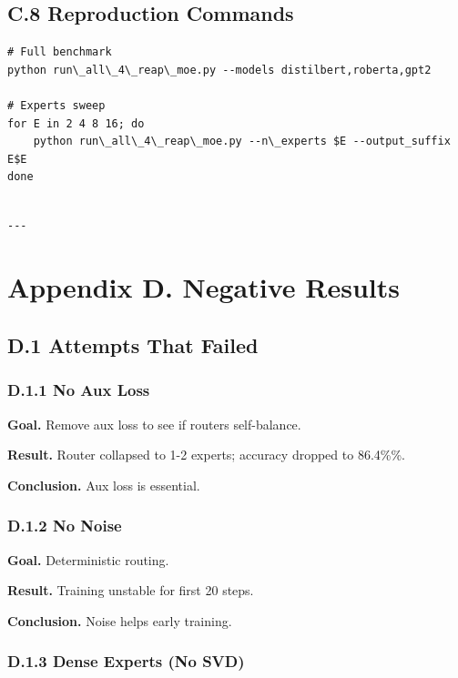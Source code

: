 \subsection{C.8 Reproduction Commands}

\begin{lstlisting}
# Full benchmark
python run\_all\_4\_reap\_moe.py --models distilbert,roberta,gpt2

# Experts sweep
for E in 2 4 8 16; do
    python run\_all\_4\_reap\_moe.py --n\_experts $E --output_suffix E$E
done
\end{lstlisting}
\begin{lstlisting}

---
\end{lstlisting}

\section{Appendix D. Negative Results}

\subsection{D.1 Attempts That Failed}

\subsubsection{D.1.1 No Aux Loss}

\textbf{Goal.} Remove aux loss to see if routers self-balance.

\textbf{Result.} Router collapsed to 1-2 experts; accuracy dropped to 86.4\%\%.

\textbf{Conclusion.} Aux loss is essential.

\subsubsection{D.1.2 No Noise}

\textbf{Goal.} Deterministic routing.

\textbf{Result.} Training unstable for first 20 steps.

\textbf{Conclusion.} Noise helps early training.

\subsubsection{D.1.3 Dense Experts (No SVD)}

